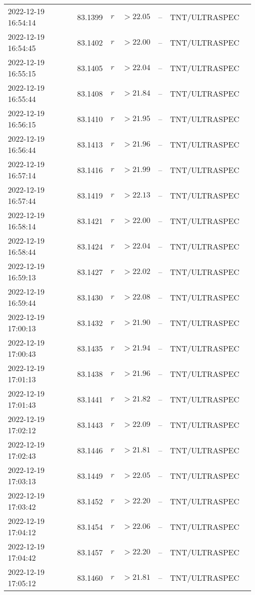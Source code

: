 \documentclass{nature_plusfigure}
\begin{document}
\begin{supplement}
\begin{center}
\begin{longtable}{lllllll}
2022-12-19 16:54:14 & 83.1399 & $r$ & $>22.05$ & -- & TNT/ULTRASPEC &  \\ 
2022-12-19 16:54:45 & 83.1402 & $r$ & $>22.00$ & -- & TNT/ULTRASPEC &  \\ 
2022-12-19 16:55:15 & 83.1405 & $r$ & $>22.04$ & -- & TNT/ULTRASPEC &  \\ 
2022-12-19 16:55:44 & 83.1408 & $r$ & $>21.84$ & -- & TNT/ULTRASPEC &  \\ 
2022-12-19 16:56:15 & 83.1410 & $r$ & $>21.95$ & -- & TNT/ULTRASPEC &  \\ 
2022-12-19 16:56:44 & 83.1413 & $r$ & $>21.96$ & -- & TNT/ULTRASPEC &  \\ 
2022-12-19 16:57:14 & 83.1416 & $r$ & $>21.99$ & -- & TNT/ULTRASPEC &  \\ 
2022-12-19 16:57:44 & 83.1419 & $r$ & $>22.13$ & -- & TNT/ULTRASPEC &  \\ 
2022-12-19 16:58:14 & 83.1421 & $r$ & $>22.00$ & -- & TNT/ULTRASPEC &  \\ 
2022-12-19 16:58:44 & 83.1424 & $r$ & $>22.04$ & -- & TNT/ULTRASPEC &  \\ 
2022-12-19 16:59:13 & 83.1427 & $r$ & $>22.02$ & -- & TNT/ULTRASPEC &  \\ 
2022-12-19 16:59:44 & 83.1430 & $r$ & $>22.08$ & -- & TNT/ULTRASPEC &  \\ 
2022-12-19 17:00:13 & 83.1432 & $r$ & $>21.90$ & -- & TNT/ULTRASPEC &  \\ 
2022-12-19 17:00:43 & 83.1435 & $r$ & $>21.94$ & -- & TNT/ULTRASPEC &  \\ 
2022-12-19 17:01:13 & 83.1438 & $r$ & $>21.96$ & -- & TNT/ULTRASPEC &  \\ 
2022-12-19 17:01:43 & 83.1441 & $r$ & $>21.82$ & -- & TNT/ULTRASPEC &  \\ 
2022-12-19 17:02:12 & 83.1443 & $r$ & $>22.09$ & -- & TNT/ULTRASPEC &  \\ 
2022-12-19 17:02:43 & 83.1446 & $r$ & $>21.81$ & -- & TNT/ULTRASPEC &  \\ 
2022-12-19 17:03:13 & 83.1449 & $r$ & $>22.05$ & -- & TNT/ULTRASPEC &  \\ 
2022-12-19 17:03:42 & 83.1452 & $r$ & $>22.20$ & -- & TNT/ULTRASPEC &  \\ 
2022-12-19 17:04:12 & 83.1454 & $r$ & $>22.06$ & -- & TNT/ULTRASPEC &  \\ 
2022-12-19 17:04:42 & 83.1457 & $r$ & $>22.20$ & -- & TNT/ULTRASPEC &  \\ 
2022-12-19 17:05:12 & 83.1460 & $r$ & $>21.81$ & -- & TNT/ULTRASPEC &  \\ 

\end{longtable}
\end{center}
\end{supplement}
\end{document}
